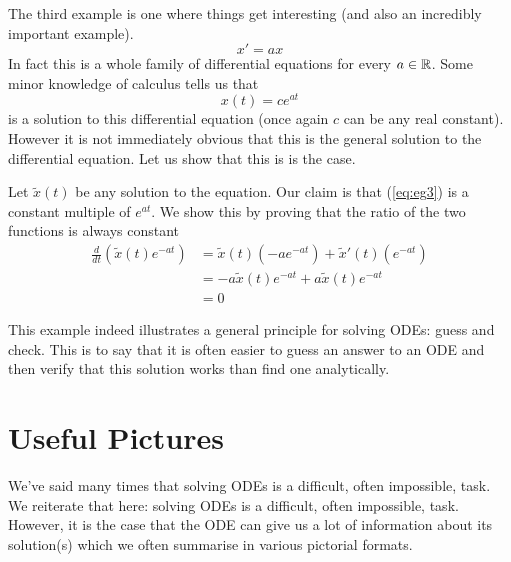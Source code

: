 The third example is one where things get interesting (and also an incredibly important example).
\begin{equation}\label{eq:eg3}
    x' = ax
\end{equation}
In fact this is a whole family of differential equations for every $a \in \mathbb{R}$. Some minor knowledge of calculus tells us that
$$ x(t) = ce^{at} $$
is a solution to this differential equation (once again $c$ can be any real constant). However it is not immediately obvious that this is the general solution to the differential equation. Let us show that this is is the case.

Let $\tilde{x}(t)$ be any solution to the equation. Our claim is that (\ref*{eq:eg3}) is a constant multiple of $e^{at}$. We show this by proving that the ratio of the two functions is always constant
\begin{align*}
    \frac{d}{dt}(\tilde{x}(t) e^{-at}) &= \tilde{x}(t)(-a e^{-at}) + \tilde{x}'(t)(e^{-at})\\
    &= -a \tilde{x}(t) e^{-at} + a \tilde{x}(t) e^{-at}\\
    &= 0
\end{align*}

This example indeed illustrates a general principle for solving ODEs: guess and check. This is to say that it is often easier to guess an answer to an ODE and then verify that this solution works than find one analytically. 

\section{Useful Pictures}
We've said many times that solving ODEs is a difficult, often impossible, task. We reiterate that here: solving ODEs is a difficult, often impossible, task. However, it is the case that the ODE can give us a lot of information about its solution(s) which we often summarise in various pictorial formats.


